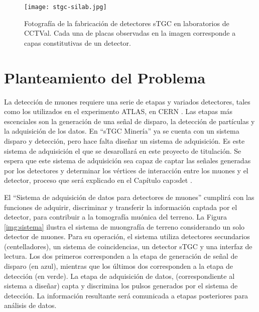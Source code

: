 	\begin{figure}[h]
		\centering
		\texttt{[image: stgc-silab.jpg]}
		\caption{Fotografía de la fabricación de detectores sTGC en laboratorios de CCTVal. Cada una de placas observadas en la imagen corresponde a capas constitutivas de un detector.}
		\label{img:stgc-silab}
	\end{figure}
	
	
%	

\section{Planteamiento del Problema}
\label{sec:planteamiento}
	La detección de muones requiere una serie de etapas y variados detectores,  tales como los utilizados en el experimento ATLAS, en CERN . Las etapas más escenciales son  la generación de una señal de disparo, la detección de partículas y la adquisición de los datos. En ``sTGC Minería'' ya se cuenta con un sistema disparo y detección, pero hace falta diseñar un sistema de adquisición. Es este sistema de adquisición el que se desarollará en este proyecto de titulación. Se espera que este sistema de adquisición sea capaz de captar las señales generadas por los detectores y determinar los vértices de interacción entre los muones y el detector, proceso que será explicado en el Capítulo {cap:sdet} . 
	
	El ``Sistema de adquisición de datos para detectores de muones'' cumplirá con las funciones de adquirir, discriminar y transferir la información captada por el detector, para contribuir a la tomografía muónica del terreno. La Figura \ref{img:sistema} ilustra el sistema de muongrafía de terreno considerando un solo detector de muones. Para su operación, el sistema utiliza detectores secundarios (centelladores), un sistema de coincidencias, un detector sTGC y una interfaz de lectura. Los dos primeros corresponden a la etapa de generación de señal de disparo (en azul), mientras que los últimos dos corresponden a la etapa de detección (en verde). La etapa de adquisición de datos, (correspondiente al sistema  a diseñar) capta y discrimina los pulsos generados por el sistema de detección. La información resultante será comunicada a etapas posteriores para análisis de datos. 
	
